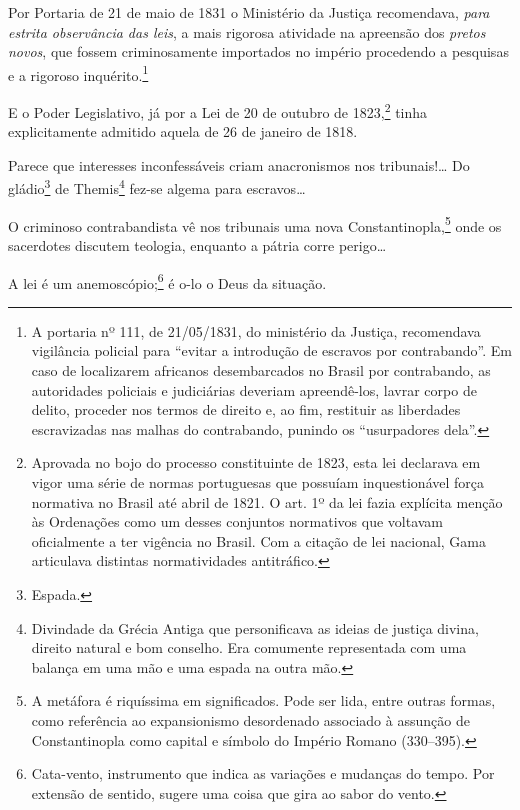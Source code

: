 Por Portaria de 21 de maio de 1831 o Ministério da Justiça recomendava,
\emph{para estrita observância das leis}, a mais rigorosa atividade na
apreensão dos \emph{pretos novos}, que fossem criminosamente importados
no império procedendo a pesquisas e a rigoroso inquérito.\footnote{A
  portaria nº 111, de 21/05/1831, do ministério da Justiça, recomendava
  vigilância policial para ``evitar a introdução de escravos por
  contrabando''. Em caso de localizarem africanos desembarcados no Brasil
  por contrabando, as autoridades policiais e judiciárias deveriam
  apreendê-los, lavrar corpo de delito, proceder nos termos de
  direito e, ao fim, restituir as liberdades escravizadas nas malhas
  do contrabando, punindo os ``usurpadores dela''.}

E o Poder Legislativo, já por a Lei de 20 de outubro de 1823,\footnote{
  Aprovada no bojo do processo constituinte de 1823, esta lei declarava
  em vigor uma série de normas portuguesas que possuíam inquestionável
  força normativa no Brasil até abril de 1821. O art. 1º da lei fazia
  explícita menção às Ordenações como um desses conjuntos normativos que
  voltavam oficialmente a ter vigência no Brasil. Com a citação de lei
  nacional, Gama articulava distintas normatividades
  antitráfico.} tinha
explicitamente admitido aquela de 26 de janeiro de 1818.

Parece que interesses inconfessáveis criam anacronismos nos
tribunais!\ldots{} Do gládio\footnote{Espada.} de Themis\footnote{
  Divindade da Grécia Antiga que personificava as ideias de justiça
  divina, direito natural e bom conselho. Era comumente representada com
  uma balança em uma mão e uma espada na outra mão.} fez-se algema para
escravos\ldots{}

O criminoso contrabandista vê nos tribunais uma nova Constantinopla,\footnote{A metáfora é riquíssima em significados. Pode ser lida, 
  entre outras formas, como referência ao expansionismo desordenado
  associado à assunção de Constantinopla como capital e símbolo do
  Império Romano (330--395).} onde os sacerdotes discutem teologia,
enquanto a pátria corre perigo\ldots{}

A lei é um anemoscópio;\footnote{Cata-vento, instrumento que indica as
  variações e mudanças do tempo. Por extensão de sentido, sugere uma
  coisa que gira ao sabor do vento.} é o-lo o Deus da situação.

